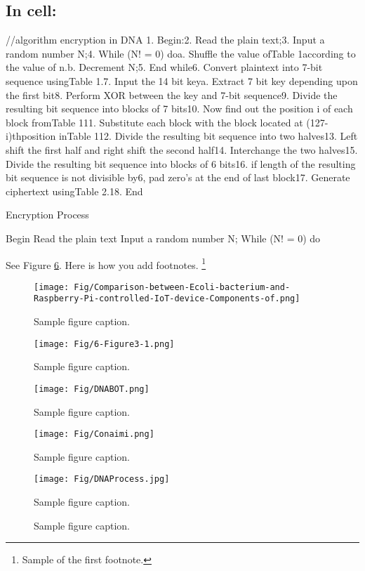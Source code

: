 \documentclass{article}
\begin{document}
\subsection{In cell:}
\lipsum[10] 
//algorithm encryption in DNA
1. Begin:2. Read the plain text;3. Input a random number N;4. While (N! = 0) doa. Shuffle the value ofTable 1according to the value of n.b. Decrement N;5. End while6. Convert plaintext into 7-bit sequence usingTable 1.7. Input the 14 bit keya. Extract 7 bit key depending upon the first bit8. Perform XOR between the key and 7-bit sequence9. Divide the resulting bit sequence into blocks of 7 bits10. Now find out the position i of each block fromTable 111. Substitute each block with the block located at (127-i)thposition inTable 112. Divide the resulting bit sequence into two halves13. Left shift the first half and right shift the second half14. Interchange the two halves15. Divide the resulting bit sequence into blocks of 6 bits16. if length of the resulting bit sequence is not divisible by6, pad zero’s at the end of last block17. Generate ciphertext usingTable 2.18. End
\begin{algorithm}
\caption{Encryption Process}\label{euclid}
\begin{algorithmic}[1]

\State Begin
\State Read the plain text
\State Input a random number N;
\State While (N! = 0) do
\State
\State
\State
\State
\State
\State
\State
\State
\State
\State
\State
\State



\EndProcedure
\end{algorithmic}
\end{algorithm}
See Figure \ref{fig:fig1}. Here is how you add footnotes. \footnote{Sample of the first footnote.}
\lipsum[11] 
\begin{figure}
\centering\texttt{[image: Fig/Comparison-between-Ecoli-bacterium-and-Raspberry-Pi-controlled-IoT-device-Components-of.png]} 
  \caption{Sample figure caption.}
\label{fig:fourchamber}\end{figure} 
\begin{figure}
\centering\texttt{[image: Fig/6-Figure3-1.png]} 
  \caption{Sample figure caption.}
\label{fig:fourchamber}\end{figure} 
\begin{figure}
\centering\texttt{[image: Fig/DNABOT.png]} 
  \caption{Sample figure caption.}
\label{fig:fourchamber}\end{figure}
\begin{figure}
\centering\texttt{[image: Fig/Conaimi.png]} 
  \caption{Sample figure caption.}
\label{fig:fourchamber}\end{figure} 
\begin{figure}
\centering\texttt{[image: Fig/DNAProcess.jpg]} 
  \caption{Sample figure caption.}
\label{fig:fourchamber}\end{figure} 
\begin{figure}
  \centering
  \fbox{\rule[-.5cm]{4cm}{4cm} \rule[-.5cm]{4cm}{0cm}}
  \caption{Sample figure caption.}
  \label{fig:fig1}
\end{figure}
\end{document}
